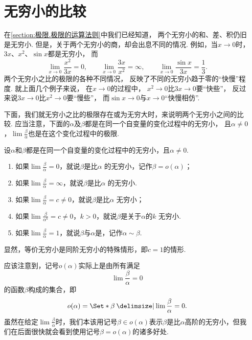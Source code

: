 \section{无穷小的比较}
在\cref{section:极限.极限的运算法则}中我们已经知道，
两个无穷小的和、差、积仍旧是无穷小.
但是，关于两个无穷小的商，却会出息不同的情况.
例如，当\(x\to0\)时，
\(3x\)、\(x^2\)、\(\sin x\)都是无穷小，
而\[
	\lim_{x\to0}\frac{x^2}{3x}=0, \qquad
	\lim_{x\to0}\frac{3x}{x^2}=\infty, \qquad
	\lim_{x\to0}\frac{\sin x}{3x}=\frac{1}{3}.
\]
两个无穷小之比的极限的各种不同情况，
反映了不同的无穷小趋于零的“快慢”程度.
就上面几个例子来说，
在\(x\to0\)的过程中，
\(x^2\to0\)比\(3x\to0\)要“快些”，
反过来说\(3x\to0\)比\(x^2\to0\)要“慢些”，
而\(\sin x\to0\)与\(x\to0\)“快慢相仿”.

下面，我们就无穷小之比的极限存在或为无穷大时，来说明两个无穷小之间的比较.
应当注意，下面的\(\alpha\)及\(\beta\)都是在同一个自变量的变化过程中的无穷小，
且\(\alpha\neq0\)，\(\lim\frac{\beta}{\alpha}\)也是在这个变化过程中的极限.

\begin{definition}
\newcommand{\lf}[1][]{\lim \frac{\beta}{\alpha^{#1}}}
设\(\alpha\)和\(\beta\)都是在同一个自变量的变化过程中的无穷小，且\(\alpha\neq0\).
\begin{enumerate}
\item 如果\(\lf=0\)，就说\(\beta\)是比\(\alpha\) 的无穷小，记作\(\beta=o(\alpha)\)；
\item 如果\(\lf=\infty\)，就说\(\beta\)是比\(\alpha\) 的无穷小.
\item 如果\(\lf=c\neq0\)，就说\(\beta\)是比\(\alpha\) 无穷小；
\item 如果\(\lf[k]=c\neq0\)，\(k>0\)，就说\(\beta\)是关于\(\alpha\)的\(k\) 无穷小.
\item 如果\(\lf=1\)，就说\(\beta\)与\(\alpha\)是，记作\(\alpha\sim\beta\).
\end{enumerate}
\end{definition}
显然，等价无穷小是同阶无穷小的特殊情形，即\(c=1\)的情形.

应该注意到，记号\(o(\alpha)\)实际上是由所有满足\[
\lim \frac{\beta}{\alpha} = 0
\]的函数\(\beta\)构成的集合，即\[
o(\alpha) = \Set*{ \beta \given \lim \frac{\beta}{\alpha} = 0 }.
\]虽然在给定\(\lim \frac{\beta}{\alpha}\)时，我们本该用记号\(\beta \in o(\alpha)\)表示\(\beta\)是比\(\alpha\)高阶的无穷小，但我们在后面很快就会看到使用记号\(\beta = o(\alpha)\)的诸多好处.

